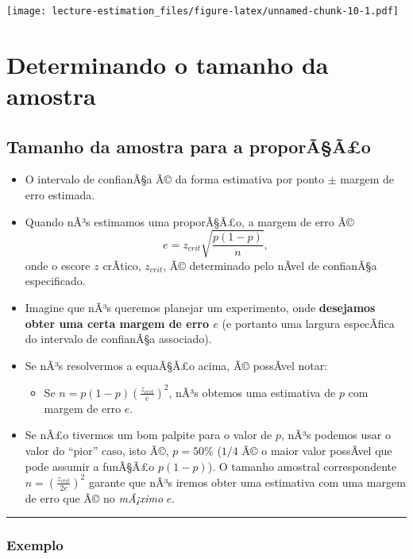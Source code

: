 \documentclass[]{article}
\providecommand{\tightlist}{%
  \setlength{\itemsep}{0pt}\setlength{\parskip}{0pt}}
\begin{document}
\texttt{[image: lecture-estimation\_files/figure-latex/unnamed-chunk-10-1.pdf]}

\section{Determinando o tamanho da
amostra}\label{determinando-o-tamanho-da-amostra}

\subsection{Tamanho da amostra para a
proporÃ§Ã£o}\label{tamanho-da-amostra-para-a-proporaao}

\begin{itemize}
\tightlist
\item
  O intervalo de confianÃ§a Ã© da forma estimativa por ponto \(\pm\)
  margem de erro estimada.
\item
  Quando nÃ³s estimamos uma proporÃ§Ã£o, a margem de erro Ã© \[
  e=z_{crit}\sqrt{\frac{p(1-p)}{n}},
  \] onde o escore \(z\) crÃ­tico, \(z_{crit}\), Ã© determinado pelo
  nÃ­vel de confianÃ§a especificado.
\item
  Imagine que nÃ³s queremos planejar um experimento, onde
  \textbf{desejamos obter uma certa margem de erro \(e\)} (e portanto
  uma largura especÃ­fica do intervalo de confianÃ§a associado).
\item
  Se nÃ³s resolvermos a equaÃ§Ã£o acima, Ã© possÃ­vel notar:

  \begin{itemize}
  \tightlist
  \item
    Se \(n=p(1-p)(\frac{z_{crit}}{e})^2\), nÃ³s obtemos uma estimativa
    de \(p\) com margem de erro \(e\).
  \end{itemize}
\item
  Se nÃ£o tivermos um bom palpite para o valor de \(p\), nÃ³s podemos
  usar o valor do ``pior'' caso, isto Ã©, \(p=50\%\) (\(1/4\) Ã© o maior
  valor possÃ­vel que pode assumir a funÃ§Ã£o \(p(1-p)\)). O tamanho
  amostral correspondente \(n=(\frac{z_{crit}}{2e})^2\) garante que nÃ³s
  iremos obter uma estimativa com uma margem de erro que Ã© no
  \emph{mÃ¡ximo} \(e\).
\end{itemize}

\begin{center}\rule{0.5\linewidth}{\linethickness}\end{center}

\subsubsection{Exemplo}\label{exemplo}
\end{document}
